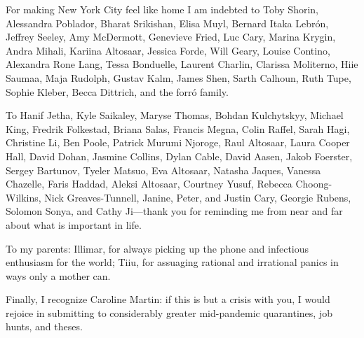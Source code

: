 {For making New York City feel like home I am indebted to Toby Shorin, Alessandra Poblador, Bharat Srikishan, Elisa Muyl, Bernard Itaka Lebrón, Jeffrey Seeley, Amy McDermott, Genevieve Fried, Luc Cary, Marina Krygin, Andra Mihali, Kariina Altosaar, Jessica Forde, Will Geary, Louise Contino, Alexandra Rone Lang, Tessa Bonduelle, Laurent Charlin, Clarissa Moliterno, Hiie Saumaa, Maja Rudolph, Gustav Kalm, James Shen, Sarth Calhoun, Ruth Tupe, Sophie Kleber, Becca Dittrich, and the forró family.

To Hanif Jetha, Kyle Saikaley, Maryse Thomas, Bohdan Kulchytskyy, Michael King, Fredrik Folkestad, Briana Salas, Francis Megna, Colin Raffel, Sarah Hagi, Christine Li, Ben Poole, Patrick Murumi Njoroge, Raul Altosaar, Laura Cooper Hall, David Dohan, Jasmine Collins, Dylan Cable, David Aasen, Jakob Foerster, Sergey Bartunov, Tyeler Matsuo, Eva Altosaar, Natasha Jaques, Vanessa Chazelle, Faris Haddad, Aleksi Altosaar, Courtney Yusuf, Rebecca Choong-Wilkins, Nick Greaves-Tunnell, Janine, Peter, and Justin Cary, Georgie Rubens, Solomon Sonya, and Cathy Ji---thank you for reminding me from near and far about what is important in life.

To my parents: Illimar, for always picking up the phone and infectious enthusiasm for the world; Tiiu, for assuaging rational and irrational panics in ways only a mother can.

Finally, I recognize Caroline Martin: if this is but a crisis with you, I would rejoice in submitting to considerably greater mid-pandemic quarantines, job hunts, and theses.
\sectionline
}